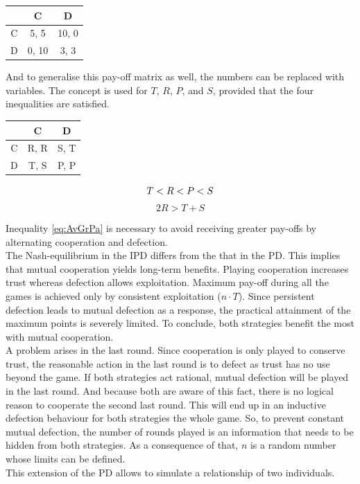\documentclass[11pt]{article}
\begin{document}
\begin{center}
\begin{tabular}{ c|c|c }
   & C & D \\ 
   \hline
 C & 5, 5 & 10, 0\\  
   \hline
 D & 0, 10 & 3, 3
\end{tabular}
\end{center}

And to generalise this pay-off matrix as well, the numbers can be replaced with variables.
The concept is used for $T$, $R$, $P$, and $S$, provided that the four inequalities are satisfied.

\begin{center}
\begin{tabular}{ c|c|c }
   & C & D \\ 
   \hline
 C & R, R & S, T\\  
   \hline
 D & T, S & P, P
\end{tabular}
\end{center}

\begin{equation}
T < R < P < S\\
\end{equation}
\begin{equation}\label{eq:AvGrPa}
2R > T + S
\end{equation}

Inequality \eqref{eq:AvGrPa} is necessary to avoid receiving greater pay-offs by alternating cooperation and defection.\\
The Nash-equilibrium in the IPD differs from the that in the PD.
This implies that mutual cooperation yields long-term benefits.
Playing cooperation increases trust whereas defection allows exploitation.
Maximum pay-off during all the games is achieved only by consistent exploitation ($n \cdot T$).
Since persistent defection leads to mutual defection as a response, the practical attainment of the maximum points is severely limited.
To conclude, both strategies benefit the most with mutual cooperation.\\
A problem arises in the last round.
Since cooperation is only played to conserve trust, the reasonable action in the last round is to defect as trust has no use beyond the game.
If both strategies act rational, mutual defection will be played in the last round.
And because both are aware of this fact, there is no logical reason to cooperate the second last round.
This will end up in an inductive defection behaviour for both strategies the whole game.
So, to prevent constant mutual defection, the number of rounds played is an information that needs to be hidden from both strategies.
As a consequence of that, $n$ is a random number whose limits can be defined.\\
This extension of the PD allows to simulate a relationship of two individuals.
\end{document}
